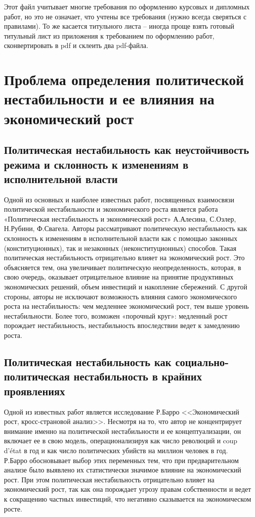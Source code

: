 \documentclass[14pt]{extarticle} %
\begin{document}
Этот файл учитывает многие требования по оформлению курсовых и дипломных работ, но это не означает, что учтены все требования (нужно всегда сверяться с правилами). То же касается титульного листа -- иногда проще взять готовый титульный лист из приложения к требованием по оформлению работ, сконвертировать в pdf и склеить два pdf-файла. 

\section{Проблема определения политической нестабильности и ее влияния на экономический рост}
\subsection{Политическая нестабильность как неустойчивость режима и склонность к изменениям в исполнительной власти}
Одной из основных и наиболее известных работ, посвященных взаимосвязи политической нестабильности и экономического роста является работа «Политическая нестабильность и экономический рост» А.Алесина, С.Озлер, Н.Рубини, Ф.Свагела. Авторы рассматривают политическую нестабильность как склонность к изменениям в исполнительной власти как с помощью законных (конституционных), так и незаконных (неконституционных) способов. Такая политическая нестабильность отрицательно влияет на экономический рост. Это объясняется тем, она увеличивает политическую неопределенность, которая, в свою очередь, оказывает отрицательное влияние на принятие продуктивных экономических решений, объем инвестиций и накопление сбережений. С другой стороны, авторы не исключают возможность влияния самого экономического роста на нестабильность: чем медленнее экономический рост, тем выше уровень нестабильности. Более того, возможен «порочный круг»: медленный рост порождает нестабильность, нестабильность впоследствии ведет к замедлению роста. 
\subsection{Политическая нестабильность как социально-политическая нестабильность в крайних проявлениях}
Одной из известных работ является исследование Р.Барро <<Экономический рост, кросс-страновой анализ>>. Несмотря на то, что автор не концентрирует внимание именно на политической нестабильности и ее концептуализации, он включает ее в свою модель, операционализируя как число революций и coup d’état в год и как число политических убийств на миллион человек в год. Р.Барро обосновывает выбор этих переменных тем,  что при предварительном анализе было выявлено их статистически значимое влияние на экономический рост. При этом политическая нестабильность отрицательно влияет на экономический рост, так как она порождает угрозу правам собственности и ведет к сокращению частных инвестиций, что негативно сказывается на экономическом росте. 
\end{document}
